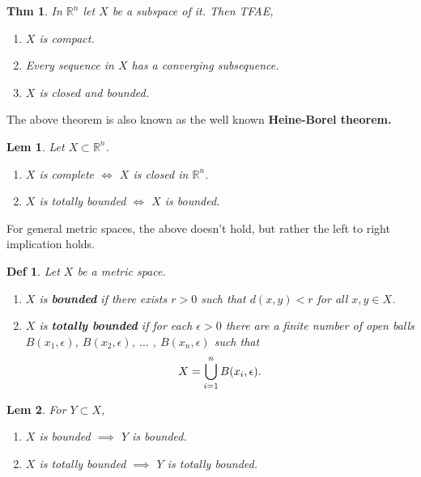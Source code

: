 \documentclass[paper=a4, fontsize=11pt]{scrartcl}
\newtheorem{theorem}{Thm}
\newtheorem{definition}{Def}
\newtheorem{lemma}{Lem}
\begin{document}
\begin{theorem}
	In $\mathbb{R}^n$ let $X$ be a subspace of it. Then TFAE, 
	\begin{enumerate}[label=\arabic*)]
		\item $X$ is compact.
		\item Every sequence in $X$ has a converging subsequence.
		\item $X$ is closed and bounded. \\
	\end{enumerate}
\end{theorem}

The above theorem is also known as the well known \textbf{Heine-Borel theorem.}\\

\begin{lemma}
	Let $X \subset \mathbb{R}^n$.
	\begin{enumerate}[label=\arabic*)]
		\item $X$ is complete $\iff$ $X$ is closed in $\mathbb{R}^n$.
		\item $X$ is totally bounded $\iff$ $X$ is bounded. \\
	\end{enumerate}
\end{lemma}

For general metric spaces, the above doesn't hold, but rather the left to right implication holds.\\

\begin{definition}
	Let $X$ be a metric space. 
	\begin{enumerate}[label=\arabic*)]
		\item $X$ is \textbf{bounded} if there exists $r>0$ such that $d(x,y)<r$ for all $x,y \in X$.
		\item $X$ is \textbf{totally bounded} if for each $\epsilon > 0$ there are a finite number of open balls $B(x_1 , \epsilon)$, $B(x_2, \epsilon)$, $\dots$ , $B(x_n, \epsilon)$ such that \\
		\begin{equation}\nonumber
			X = \bigcup\limits_{i=1}^n B(x_i,\epsilon). \\
		\end{equation}
	\end{enumerate}
\end{definition}

\begin{lemma}
	For $Y\subset X$, 
	\begin{enumerate}[label = \arabic*) ]
		\item $X$ is bounded $\implies$ $Y$ is bounded. 
		\item $X$ is totally bounded $\implies$ $Y$ is totally bounded.\\
	\end{enumerate}
\end{lemma}
\end{document}
